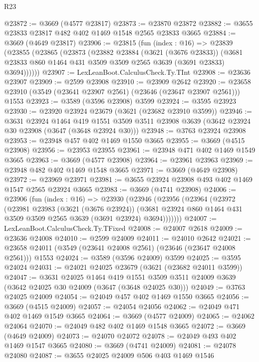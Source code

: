 \begin{lexlean}{R23}
\begin{coremodule}
@23872 := @3669 (@4577 @23817)
@23873 := @23870 @23872
@23882 := @3655 @23833 @23817 @482 @402 @1469 @1548 @2565 @23833 @3665
@23884 := @3669 (@4649 @23817)
@23906 := @23815
    (fun (index : @16) =>
    @23839
      (@23855
        (@23865
          (@23873
            (@23882
              @23884
              (@3621 (@3676 @23833))
              (@3681 @23833 @860 @1464 @431 @3509 @3509 @2565 @3639 (@3691 @23833) @3694))))))
@23907 := LexLeanBoot.CalculusCheck.Ty.TInt
@23908 := @23636 @23907
@23909 := @2599 @23908
@23910 := @23909 @2642
@23920 := @23658 @23910 (@3549 (@23641 @23907 @2561) (@23646 (@23647 @23907 @2561))) @1553
@23923 := @3589 (@3596 @23908) @3599
@23924 := @3595 @23923
@23930 := @23920 @23924 @23679 (@3621 (@23682 @23910 @3599))
@23946 := @3631
    @23924
    @1464
    @419
    @1551
    @3509
    @3511
    @23908
    @3639
    (@3642 @23924 @30 @23908 (@3647 (@3648 @23924 @30)))
@23948 := @3763 @23924 @23908
@23953 := @23948 @457 @402 @1469 @1550 @3665
@23955 := @3669 (@4515 @23908)
@23956 := @23953 @23955
@23961 := @23948 @471 @402 @1469 @1549 @3665
@23963 := @3669 (@4577 @23908)
@23964 := @23961 @23963
@23969 := @23948 @482 @402 @1469 @1548 @3665
@23971 := @3669 (@4649 @23908)
@23972 := @23969 @23971
@23981 := @3655 @23924 @23908 @493 @402 @1469 @1547 @2565 @23924 @3665
@23983 := @3669 (@4741 @23908)
@24006 := @23906
    (fun (index : @16) =>
    @23930
      (@23946
        (@23956
          (@23964
            (@23972
              (@23981
                @23983
                (@3621 (@3676 @23924))
                (@3681 @23924 @860 @1464 @431 @3509 @3509 @2565 @3639 (@3691 @23924) @3694)))))))
@24007 := LexLeanBoot.CalculusCheck.Ty.TFixed
@24008 := @24007 @2618
@24009 := @23636 @24008
@24010 := @2599 @24009
@24011 := @24010 @2642
@24021 := @23658 @24011 (@3549 (@23641 @24008 @2561) (@23646 (@23647 @24008 @2561))) @1553
@24024 := @3589 (@3596 @24009) @3599
@24025 := @3595 @24024
@24031 := @24021 @24025 @23679 (@3621 (@23682 @24011 @3599))
@24047 := @3631
    @24025
    @1464
    @419
    @1551
    @3509
    @3511
    @24009
    @3639
    (@3642 @24025 @30 @24009 (@3647 (@3648 @24025 @30)))
@24049 := @3763 @24025 @24009
@24054 := @24049 @457 @402 @1469 @1550 @3665
@24056 := @3669 (@4515 @24009)
@24057 := @24054 @24056
@24062 := @24049 @471 @402 @1469 @1549 @3665
@24064 := @3669 (@4577 @24009)
@24065 := @24062 @24064
@24070 := @24049 @482 @402 @1469 @1548 @3665
@24072 := @3669 (@4649 @24009)
@24073 := @24070 @24072
@24078 := @24049 @493 @402 @1469 @1547 @3665
@24080 := @3669 (@4741 @24009)
@24081 := @24078 @24080
@24087 := @3655 @24025 @24009 @506 @403 @1469 @1546

\end{coremodule}
\end{lexlean}
